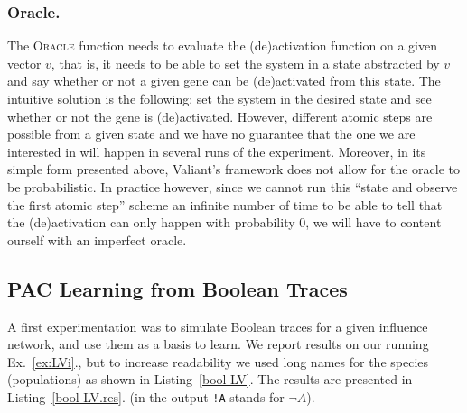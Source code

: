 \documentclass{llncs}
\begin{document}
\subsubsection{Oracle.}
The \textsc{Oracle} function needs to evaluate the (de)activation function on a given vector $v$, that is, it needs to be able to set the system in a state abstracted by $v$ and say whether or not a given gene can be (de)activated from this state.
The intuitive solution is the following: set the system in the desired state and see whether or not the gene is (de)activated. 
However, different atomic steps are possible from a given state and we have no guarantee that the one we are interested in will happen
in several runs of the experiment. 
Moreover, in its simple form presented above, %
Valiant's framework does not allow for the oracle to be probabilistic.
In practice however, since we cannot run this ``state and observe the first atomic step'' scheme an infinite number of time to be able to tell that the (de)activation can only happen with probability 0,
we will have to content ourself with an imperfect oracle.


\subsection{PAC Learning from Boolean Traces}

A first experimentation was to simulate Boolean traces for a given influence network, and use them as a basis to learn.
We report results on our running
Ex.~\ref{ex:LVi}., but to increase readability we used long names for the
species (populations) as shown in Listing~\ref{bool-LV}.
The results are presented in Listing~\ref{bool-LV.res}.
(in the output \texttt{!A} stands for $\neg A$).

\end{document}
